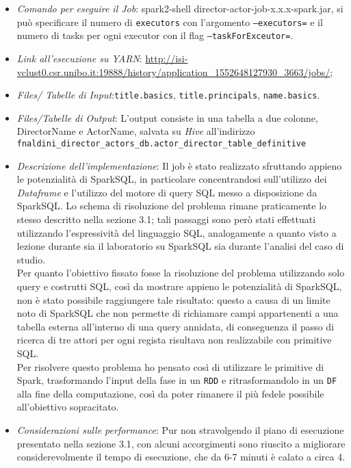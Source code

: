 \documentclass[hidelinks]{article}
\begin{document}
\begin{itemize}
	\item \textit{Comando per eseguire il Job}: spark2-shell director-actor-job-x.x.x-spark.jar, si può specificare il numero di \texttt{executors} con l'argomento \texttt{--executors=} e il numero di tasks per ogni executor con il flag \texttt{--taskForExceutor=}.
	\item \textit{Link all'esecuzione su YARN}:
	\url{http://isi-vclust0.csr.unibo.it:19888/history/application_1552648127930_3663/jobs/}; 
	
	\item \textit{Files/ Tabelle di Input}:\texttt{title.basics}, \texttt{title.principals}, \texttt{name.basics}.
	\item \textit{Files/Tabelle di Output}: L'output consiste in una tabella a due colonne, DirectorName e ActorName, salvata su \textit{Hive} all'indirizzo\\  \texttt{fnaldini\_director\_actors\_db.actor\_director\_table\_definitive}
	\item \textit{Descrizione dell'implementazione}: Il job è stato realizzato sfruttando appieno le potenzialità di SparkSQL, in particolare concentrandosi sull'utilizzo dei \textit{Dataframe} e l'utilizzo del motore di query SQL messo a disposizione da SparkSQL.
	Lo schema di risoluzione del problema rimane praticamente lo stesso descritto nella sezione 3.1; tali passaggi sono però stati effettuati utilizzando l'espressività del linguaggio SQL, analogamente a quanto visto a lezione durante sia il laboratorio su SparkSQL sia durante l'analisi del caso di studio.\\
	Per quanto l'obiettivo fissato fosse la risoluzione del problema utilizzando solo query e costrutti SQL, così da mostrare appieno le potenzialità di SparkSQL, non è stato possibile raggiungere tale risultato: questo a causa di un limite noto di SparkSQL che non permette di richiamare campi appartenenti a una tabella esterna all'interno di una query annidata, di conseguenza il passo di ricerca di tre attori per ogni regista risultava non realizzabile con primitive SQL.\\
	Per risolvere questo problema ho pensato così di utilizzare le primitive di Spark, trasformando l'input della fase in un \texttt{RDD} e ritrasformandolo in un \texttt{DF} alla fine della computazione, così da poter rimanere il più fedele possibile all'obiettivo sopracitato.
	
	\item \textit{Considerazioni sulle performance}: Pur non stravolgendo il piano di esecuzione presentato nella sezione 3.1, con alcuni accorgimenti sono riuscito a migliorare considerevolmente il tempo di esecuzione, che da 6-7 minuti è calato a circa 4.
	

\end{itemize}
\end{document}
